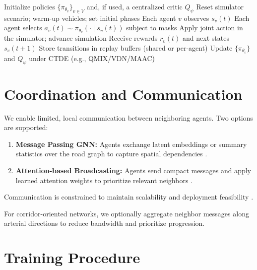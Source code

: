 \documentclass[12pt]{report} %
\begin{document}
\begin{algorithm}
\caption{General CTDE MARL framework for traffic signal control (the implemented instance is the parameter-shared DQN evaluated in the Experiments and Results chapter).}
\label{alg:ctde}
\begin{algorithmic}[1]
\State Initialize policies $\{\pi_{\theta_v}\}_{v\in V}$ and, if used, a centralized critic $Q_{\psi}$
  \State Reset simulator scenario; warm-up vehicles; set initial phases
    \State Each agent $v$ observes $s_v(t)$
    \State Each agent selects $a_v(t) \sim \pi_{\theta_v}(\cdot\mid s_v(t))$ subject to masks
    \State Apply joint action in the simulator; advance simulation
    \State Receive rewards $r_v(t)$ and next states $s_v(t+1)$
    \State Store transitions in replay buffers (shared or per-agent)
    \State Update $\{\pi_{\theta_v}\}$ and $Q_{\psi}$ under CTDE (e.g., QMIX/VDN/MAAC)
  \EndFor
\EndFor
\end{algorithmic}
\end{algorithm}

\section{Coordination and Communication}

We enable limited, local communication between neighboring agents. Two options are supported:
\begin{enumerate}
  \item \textbf{Message Passing GNN:} Agents exchange latent embeddings or summary statistics over the road graph to capture spatial dependencies \cite{GraphLight2023,GNN_Traffic2022}.
  \item \textbf{Attention-based Broadcasting:} Agents send compact messages and apply learned attention weights to prioritize relevant neighbors \cite{Colight_2019,AttentionMARL2024}.
\end{enumerate}
Communication is constrained to maintain scalability and deployment feasibility \cite{CommEfficient_2023,GPLight_IJCAI2023}.

For corridor-oriented networks, we optionally aggregate neighbor messages along arterial directions to reduce bandwidth and prioritize progression.

\section{Training Procedure}
\end{document}

